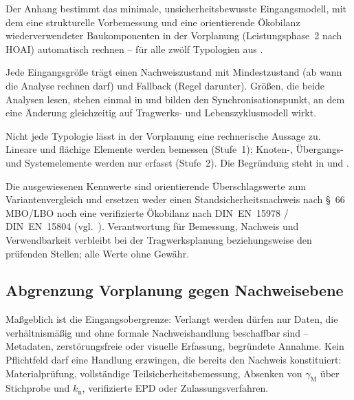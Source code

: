\label{anlage:eingangsmodell}


Der Anhang bestimmt das minimale, unsicherheitsbewusste Eingangsmodell, mit dem eine strukturelle Vorbemessung und eine orientierende Ökobilanz wiederverwendeter Baukomponenten in der Vorplanung (Leistungsphase~2 nach HOAI) automatisch rechnen -- für alle zwölf Typologien aus .

Jede Eingangsgröße trägt einen Nachweiszustand mit Mindestzustand (ab wann die Analyse rechnen darf) und Fallback (Regel darunter). Größen, die beide Analysen lesen, stehen einmal in  und bilden den Synchronisationspunkt, an dem eine Änderung gleichzeitig auf Tragwerks- und Lebenszyklusmodell wirkt.

Nicht jede Typologie lässt in der Vorplanung eine rechnerische Aussage zu. Lineare und flächige Elemente werden bemessen (Stufe~1); Knoten-, Übergangs- und Systemelemente werden nur erfasst (Stufe~2). Die Begründung steht in  und .

\begin{Window}[title=Hinweis zur Vorplanung (Leistungsphase 2 nach HOAI)]
Die ausgewiesenen Kennwerte sind orientierende Überschlagswerte zum Variantenvergleich und ersetzen weder einen Standsicherheitsnachweis nach §~66 MBO/LBO noch eine verifizierte Ökobilanz nach DIN~EN~15978 / DIN~EN~15804 (vgl.\ ). Verantwortung für Bemessung, Nachweis und Verwendbarkeit verbleibt bei der Tragwerksplanung beziehungsweise den prüfenden Stellen; alle Werte ohne Gewähr.
\end{Window}



\subsection{Abgrenzung Vorplanung gegen Nachweisebene}

Maßgeblich ist die Eingangsobergrenze: Verlangt werden dürfen nur Daten, die verhältnismäßig und ohne formale Nachweishandlung beschaffbar sind -- Metadaten, zerstörungsfreie oder visuelle Erfassung, begründete Annahme. Kein Pflichtfeld darf eine Handlung erzwingen, die bereits den Nachweis konstituiert: Materialprüfung, vollständige Teilsicherheitsbemessung, Absenken von $\gamma_\mathrm{M}$ über Stichprobe und $k_\mathrm{n}$, verifizierte EPD oder Zulassungsverfahren.

